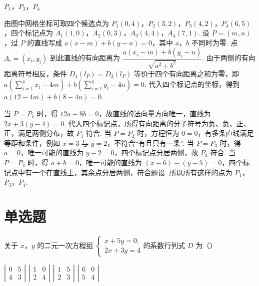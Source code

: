 \begin{answer}
\(P_1\)，\(P_3\)，\(P_4\)
\end{answer}

\begin{solution}
由图中网格坐标可取四个候选点为 \(P_1(0,4)\)，\(P_2(3,2)\)，\(P_3(4,2)\)，\(P_4(6,5)\)，四个标记点为 \(A_1(1,0)\)，\(A_2(0,3)\)，\(A_3(4,4)\)，\(A_4(7,1)\). 设 \(P=(m,n)\)，过 \(P\) 的直线写成 \(a(x-m)+b(y-n)=0\)，其中 \(a\)，\(b\) 不同时为零. 点 \(A_i=(x_i,y_i)\) 到此直线的有向距离为 \(\dfrac{a(x_i-m)+b(y_i-n)}{\sqrt{a^2+b^2}}\). 由于两侧的有向距离符号相反，条件 \(D_1(l_P)=D_2(l_P)\) 等价于四个有向距离之和为零，即
\(a\left(\sum_{i=1}^4x_i-4m\right)+b\left(\sum_{i=1}^4y_i-4n\right)=0\). 代入四个标记点的坐标，得到 \(a(12-4m)+b(8-4n)=0\).

当 \(P=P_1\) 时，得 \(12a-8b=0\)，故直线的法向量方向唯一，直线为 \(2x+3(y-4)=0\). 代入四个标记点，所得有向距离的分子符号为负、负、正、正，满足两侧分布，故 \(P_1\) 符合. 当 \(P=P_2\) 时，方程恒为 \(0=0\)，有多条直线满足等距和条件，例如 \(x=3\) 与 \(y=2\)，不符合“有且只有一条”. 当 \(P=P_3\) 时，得 \(a=0\)，唯一可能的直线为 \(y-2=0\)，四个标记点分居两侧，故 \(P_3\) 符合. 当 \(P=P_4\) 时，得 \(a+b=0\)，唯一可能的直线为 \((x-6)-(y-5)=0\)，四个标记点中有一个在直线上，其余点分居两侧，符合题设. 所以所有这样的点为 \(P_1\)，\(P_3\)，\(P_4\).
\end{solution}

\section{单选题}

\begin{problem}
关于 \(x\)，\(y\) 的二元一次方程组
\(\begin{cases}
x+5y=0,\\
2x+3y=4
\end{cases}\)的系数行列式 \(D\) 为（\quad）

\choices
    {\(\left|\begin{matrix}0&5\\ 4&3\end{matrix}\right|\)}
    {\(\left|\begin{matrix}1&0\\ 2&4\end{matrix}\right|\)}
    {\(\left|\begin{matrix}1&5\\ 2&3\end{matrix}\right|\)}
    {\(\left|\begin{matrix}6&0\\ 5&4\end{matrix}\right|\)}
\end{problem}

